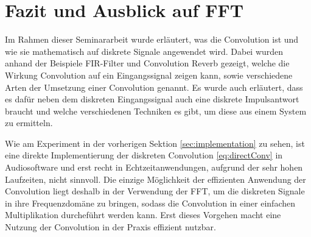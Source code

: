 \section{Fazit und Ausblick auf FFT}
\label{sec:implementationconclusion}

Im Rahmen dieser Seminararbeit wurde erläutert, was die Convolution ist
und wie sie mathematisch auf diskrete Signale angewendet wird.
Dabei wurden anhand der Beispiele FIR-Filter und Convolution Reverb gezeigt, welche die Wirkung Convolution
auf ein Eingangssignal zeigen kann, sowie verschiedene Arten der Umsetzung einer Convolution genannt.
Es wurde auch erläutert, dass es dafür neben dem diskreten Eingangssignal auch eine
diskrete Impulsantwort braucht und welche verschiedenen Techniken es gibt, um diese aus
einem System zu ermitteln.

Wie am Experiment in der vorherigen Sektion \ref{sec:implementation} zu sehen, ist eine
direkte Implementierung der diskreten Convolution \ref{eq:directConv} in Audiosoftware und erst recht
in Echtzeitanwendungen, aufgrund der sehr hohen Laufzeiten, nicht sinnvoll.
Die einzige Möglichkeit der effizienten Anwendung der Convolution liegt deshalb in
der Verwendung der FFT, um die diskreten Signale in ihre Frequenzdomäne zu bringen, sodass
die Convolution in einer einfachen Multiplikation durcheführt werden kann.
Erst dieses Vorgehen macht eine Nutzung der Convolution in der Praxis effizient nutzbar.

